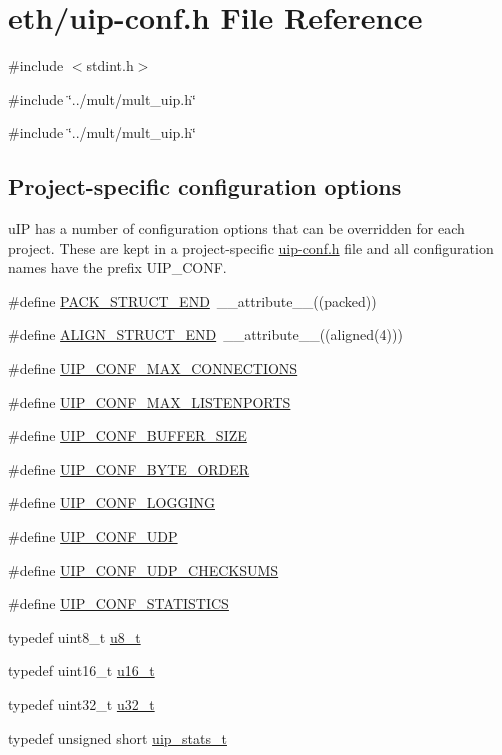 \hypertarget{uip-conf_8h}{
\section{eth/uip-\/conf.h File Reference}
\label{uip-conf_8h}
}
{\ttfamily \#include $<$stdint.h$>$}\par
{\ttfamily \#include \char`\"{}../mult/mult\_\-uip.h\char`\"{}}\par
{\ttfamily \#include \char`\"{}../mult/mult\_\-uip.h\char`\"{}}\par
\subsection*{Project-\/specific configuration options}
\label{_amgrpa633c8dacb583c46c2a4af56ab61e8ca}
 uIP has a number of configuration options that can be overridden for each project. These are kept in a project-\/specific \hyperlink{uip-conf_8h}{uip-\/conf.h} file and all configuration names have the prefix UIP\_\-CONF. \begin{DoxyCompactItemize}
\item 
\#define \hyperlink{group__uipfw_gae92a74cc7ea3eba5d3d56b9caa77d2ad}{PACK\_\-STRUCT\_\-END}~\_\-\_\-attribute\_\-\_\-((packed))
\item 
\#define \hyperlink{group__uipfw_ga8dbc55e1183365cafdd75d7c18215bb2}{ALIGN\_\-STRUCT\_\-END}~\_\-\_\-attribute\_\-\_\-((aligned(4)))
\item 
\#define \hyperlink{group__uipfw_ga3f6f1f6f98431f2d33ed30a30d2ccc35}{UIP\_\-CONF\_\-MAX\_\-CONNECTIONS}
\item 
\#define \hyperlink{group__uipfw_ga974c9b4bbe6b07cc1d64ac4fad278030}{UIP\_\-CONF\_\-MAX\_\-LISTENPORTS}
\item 
\#define \hyperlink{group__uipfw_gacacc406c3bf7d0e00412e4c946252739}{UIP\_\-CONF\_\-BUFFER\_\-SIZE}
\item 
\#define \hyperlink{group__uipfw_gaca1240bba5dd57f8c7c27123c84a1f6d}{UIP\_\-CONF\_\-BYTE\_\-ORDER}
\item 
\#define \hyperlink{group__uipfw_ga3001114ddadc1f2ada5cc9a780e866fc}{UIP\_\-CONF\_\-LOGGING}
\item 
\#define \hyperlink{group__uipfw_ga763f12007aad8cc0e483bf50f8a8d9b4}{UIP\_\-CONF\_\-UDP}
\item 
\#define \hyperlink{group__uipfw_ga9dd44616d41cef74d3beb51d8be5ecec}{UIP\_\-CONF\_\-UDP\_\-CHECKSUMS}
\item 
\#define \hyperlink{group__uipfw_ga529648ad3b0b327a43689b0f1779ff55}{UIP\_\-CONF\_\-STATISTICS}
\item 
typedef uint8\_\-t \hyperlink{group__uipfw_ga4caecabca98b43919dd11be1c0d4cd8e}{u8\_\-t}
\item 
typedef uint16\_\-t \hyperlink{group__uipfw_ga77570ac4fcab86864fa1916e55676da2}{u16\_\-t}
\item 
typedef uint32\_\-t \hyperlink{group__uipfw_ga4c14294869aceba3ef9d4c0c302d0f33}{u32\_\-t}
\item 
typedef unsigned short \hyperlink{group__uipfw_ga727459e5c4f777543c81ffffa3df3f0c}{uip\_\-stats\_\-t}
\end{DoxyCompactItemize}


